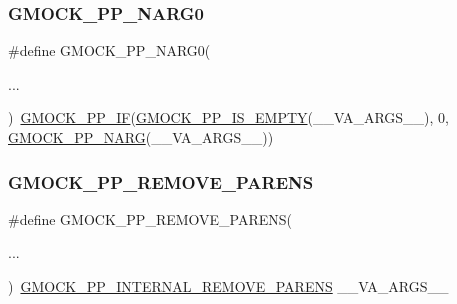 \subsubsection{\texorpdfstring{GMOCK\_PP\_NARG0}{GMOCK\_PP\_NARG0}}
{\footnotesize\ttfamily \#define G\+M\+O\+C\+K\+\_\+\+P\+P\+\_\+\+N\+A\+R\+G0(\begin{DoxyParamCaption}\item[{}]{... }\end{DoxyParamCaption})~\mbox{\hyperlink{_obj__test_2lib_2googletest-master_2googlemock_2include_2gmock_2internal_2gmock-pp_8h_a82f153fedbaf56bf71b8272bdf672875}{G\+M\+O\+C\+K\+\_\+\+P\+P\+\_\+\+IF}}(\mbox{\hyperlink{_obj__test_2lib_2googletest-master_2googlemock_2include_2gmock_2internal_2gmock-pp_8h_a14eb10c5cc7380d072cd748661140f45}{G\+M\+O\+C\+K\+\_\+\+P\+P\+\_\+\+I\+S\+\_\+\+E\+M\+P\+TY}}(\+\_\+\+\_\+\+V\+A\+\_\+\+A\+R\+G\+S\+\_\+\+\_\+), 0, \mbox{\hyperlink{_obj__test_2lib_2googletest-master_2googlemock_2include_2gmock_2internal_2gmock-pp_8h_a9db18220b88597a07704bc7cf3b13304}{G\+M\+O\+C\+K\+\_\+\+P\+P\+\_\+\+N\+A\+RG}}(\+\_\+\+\_\+\+V\+A\+\_\+\+A\+R\+G\+S\+\_\+\+\_\+))}

\mbox{\label{_obj__test_2lib_2googletest-master_2googlemock_2include_2gmock_2internal_2gmock-pp_8h_a56df0c468739cd6319be90b805a6d5b0}} 
\subsubsection{\texorpdfstring{GMOCK\_PP\_REMOVE\_PARENS}{GMOCK\_PP\_REMOVE\_PARENS}}
{\footnotesize\ttfamily \#define G\+M\+O\+C\+K\+\_\+\+P\+P\+\_\+\+R\+E\+M\+O\+V\+E\+\_\+\+P\+A\+R\+E\+NS(\begin{DoxyParamCaption}\item[{}]{... }\end{DoxyParamCaption})~\mbox{\hyperlink{_obj__test_2lib_2googletest-master_2googlemock_2include_2gmock_2internal_2gmock-pp_8h_ac3c1fba05dad44080330c0ecd1208ca6}{G\+M\+O\+C\+K\+\_\+\+P\+P\+\_\+\+I\+N\+T\+E\+R\+N\+A\+L\+\_\+\+R\+E\+M\+O\+V\+E\+\_\+\+P\+A\+R\+E\+NS}} \+\_\+\+\_\+\+V\+A\+\_\+\+A\+R\+G\+S\+\_\+\+\_\+}

\mbox{\label{_obj__test_2lib_2googletest-master_2googlemock_2include_2gmock_2internal_2gmock-pp_8h_ab2a0d358d2eb3f04395d0494ab7aab01}} 
